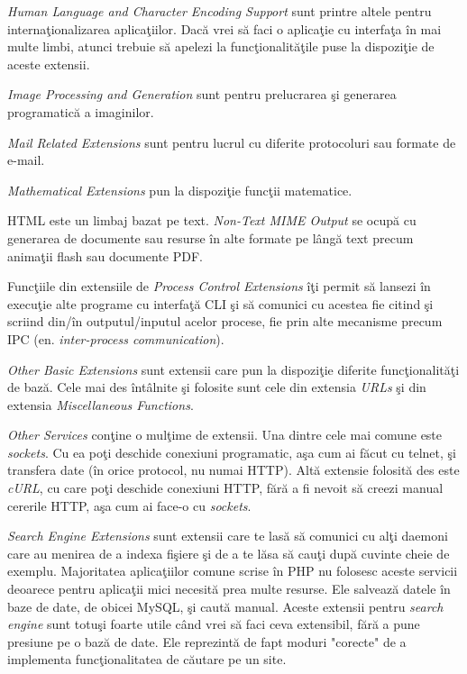 \textit{Human Language and Character Encoding Support} sunt
printre altele pentru internaţionalizarea aplicaţiilor.
Dacă vrei să faci o aplicaţie cu interfaţa în mai multe
limbi, atunci trebuie să apelezi la funcţionalităţile
puse la dispoziţie de aceste extensii.

\textit{Image Processing and Generation} sunt pentru
prelucrarea şi generarea programatică a imaginilor.

\textit{Mail Related Extensions} sunt pentru
lucrul cu diferite protocoluri sau formate de e-mail.

\textit{Mathematical Extensions} pun la dispoziţie
funcţii matematice.

HTML este un limbaj bazat pe text.
\textit{Non-Text MIME Output} se ocupă cu
generarea de documente sau resurse în alte formate pe
lângă text precum animaţii flash sau documente PDF.

Funcţiile din extensiile de \textit{Process Control Extensions}
îţi permit să lansezi în execuţie alte programe cu interfaţă
CLI şi să
comunici cu acestea fie citind şi scriind din/în outputul/inputul
acelor procese, fie prin alte mecanisme precum IPC
(en. \textsl{inter-process communication}).

\textit{Other Basic Extensions} sunt extensii care pun
la dispoziţie diferite funcţionalităţi de bază.
Cele mai des întâlnite şi folosite sunt cele din
extensia \textit{URLs} şi din extensia \textit{Miscellaneous Functions}.

\textit{Other Services} conţine o mulţime de extensii. Una dintre
cele mai comune este \textit{sockets}. Cu ea poţi deschide
conexiuni programatic, aşa cum ai făcut cu telnet, şi transfera
date (în orice protocol, nu numai HTTP). Altă extensie folosită des
este \textit{cURL}, cu care poţi deschide conexiuni HTTP, fără
a fi nevoit să creezi manual cererile HTTP, aşa cum ai face-o cu
\textit{sockets}.

\textit{Search Engine Extensions} sunt extensii care te lasă
să comunici cu alţi daemoni care au menirea de a indexa
fişiere şi de a te lăsa să cauţi după cuvinte cheie de
exemplu. Majoritatea aplicaţiilor comune scrise în PHP
nu folosesc aceste servicii deoarece pentru aplicaţii mici
necesită prea multe resurse. Ele salvează datele în baze de
date, de obicei MySQL, şi caută manual. Aceste extensii
pentru \textit{search engine} sunt totuşi foarte
utile când vrei să faci ceva extensibil, fără a pune
presiune pe o bază de date. Ele reprezintă de fapt moduri "corecte"
de a implementa funcţionalitatea de căutare pe un site.

